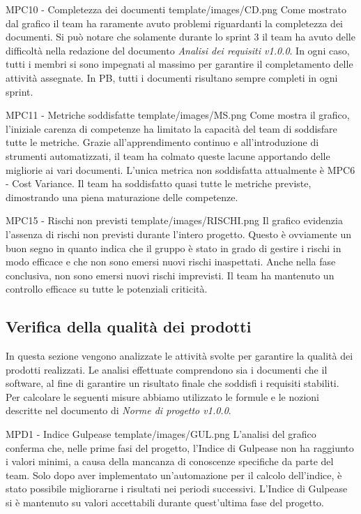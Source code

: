 \Met
{ %
    MPC10 - Completezza dei documenti
}
{ %
    template/images/CD.png
}
{ %
    Come mostrato dal grafico il team ha raramente avuto problemi riguardanti la completezza dei documenti.
    Si può notare che solamente durante lo sprint 3 il team ha avuto delle difficoltà nella redazione del documento \textit{Analisi dei requisiti v1.0.0}.
    In ogni caso, tutti i membri si sono impegnati al massimo per garantire il completamento delle attività assegnate.
}
{ %
    In PB, tutti i documenti risultano sempre completi in ogni sprint.
}

\Met
{ %
    MPC11 - Metriche soddisfatte
}
{ %
    template/images/MS.png
}
{ %
    Come mostra il grafico, l'iniziale carenza di competenze ha limitato la capacità del team di soddisfare tutte le metriche.
    Grazie all'apprendimento continuo e all'introduzione di strumenti automatizzati, il team ha colmato queste lacune apportando delle migliorie ai vari documenti.
    L'unica metrica non soddisfatta attualmente è MPC6 - Cost Variance.
}
{ %
    Il team ha soddisfatto quasi tutte le metriche previste, dimostrando una piena maturazione delle competenze.
}

\Met
{ %
    MPC15 - Rischi non previsti
}
{ %
    template/images/RISCHI.png
}
{ %
    Il grafico evidenzia l'assenza di rischi non previsti durante l'intero progetto.
    Questo è ovviamente un buon segno in quanto indica che il gruppo è stato in grado 
    di gestire i rischi in modo efficace e che non sono emersi nuovi rischi inaspettati.
}
{ %
    Anche nella fase conclusiva, non sono emersi nuovi rischi imprevisti. Il team ha mantenuto un controllo efficace su tutte le potenziali criticità.
}

\subsection{Verifica della qualità dei prodotti}
In questa sezione vengono analizzate le attività svolte per garantire la qualità dei prodotti realizzati.
Le analisi effettuate comprendono sia i documenti che il software, al fine di garantire un risultato finale che soddisfi i requisiti stabiliti.\\
Per calcolare le seguenti misure abbiamo utilizzato le formule e le nozioni descritte nel documento di \textit{Norme di progetto v1.0.0}.

\Met
{ %
    MPD1 - Indice Gulpease
}
{ %
    template/images/GUL.png
}
{ %
    L'analisi del grafico conferma che, nelle prime fasi del progetto, l'Indice di Gulpease non ha raggiunto i 
    valori minimi, a causa della mancanza di conoscenze specifiche da parte del team.
    Solo dopo aver implementato un'automazione per il calcolo dell'indice, è stato possibile 
    migliorarne i risultati nei periodi successivi.
}
{ %
    L'Indice di Gulpease si è mantenuto su valori accettabili durante quest'ultima fase del progetto.
}

